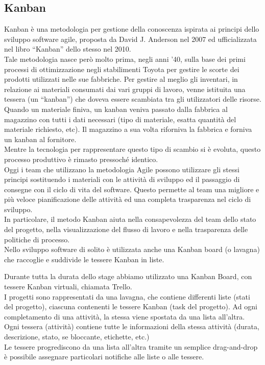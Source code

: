 \subsection{Kanban}
Kanban è una metodologia per gestione della conoscenza ispirata ai principi
dello sviluppo software agile, proposta da David J. Anderson nel 2007 ed
ufficializzata nel  libro \textquotedblleft{}Kanban\textquotedblright{}
dello stesso nel 2010.\\
Tale metodologia nasce però molto prima, negli anni '40, sulla base dei primi
processi di ottimizzazione negli stabilimenti Toyota per gestire le scorte dei
prodotti utilizzati nelle sue fabbriche. Per gestire al meglio gli inventari,
in relazione ai materiali consumati dai vari gruppi di lavoro, venne istituita
una tessera (un \textquotedblleft{}kanban\textquotedblright{}) che doveva essere
scambiata tra gli utilizzatori delle risorse\cite{kanban-website}.\\
Quando un materiale finiva, un kanban veniva passato dalla fabbrica al magazzino
con tutti i dati necessari (tipo di materiale, esatta quantità del materiale
richiesto, etc). Il magazzino a sua volta riforniva la fabbrica e forniva un kanban al fornitore.\\
Mentre la tecnologia per rappresentare questo tipo di scambio si è evoluta,
questo processo produttivo è rimasto pressoché identico.\\
Oggi i team che utilizzano la metodologia Agile possono utilizzare gli stessi
principi sostituendo i materiali con le attività di sviluppo ed il passaggio di
consegne con il ciclo di vita del software.
Questo permette al team una migliore e più veloce pianificazione delle attività
ed una completa trasparenza nel ciclo di sviluppo.\\
In particolare, il metodo Kanban aiuta nella consapevolezza del team dello stato
del progetto, nella visualizzazione del flusso di lavoro e nella trasparenza delle
politiche di processo.\\
Nello sviluppo software di solito è utilizzata anche una Kanban board (o lavagna)
che raccoglie e suddivide le tessere Kanban in liste.

Durante tutta la durata dello stage abbiamo utilizzato una Kanban Board, con
tessere Kanban virtuali, chiamata Trello.\\
I progetti sono rappresentati da una lavagna, che contiene differenti liste
(stati del progetto), ciascuna contenenti le tessere Kanban (task del progetto).
Ad ogni completamento di una attività, la stessa viene spostata da una lista
all’altra. Ogni tessera (attività) contiene tutte le informazioni della stessa
attività (durata, descrizione, stato, se bloccante, etichette, etc.)\\
Le tessere progrediscono da una lista all’altra tramite un semplice drag-and-drop
 è possibile assegnare particolari notifiche alle liste o alle tessere.
